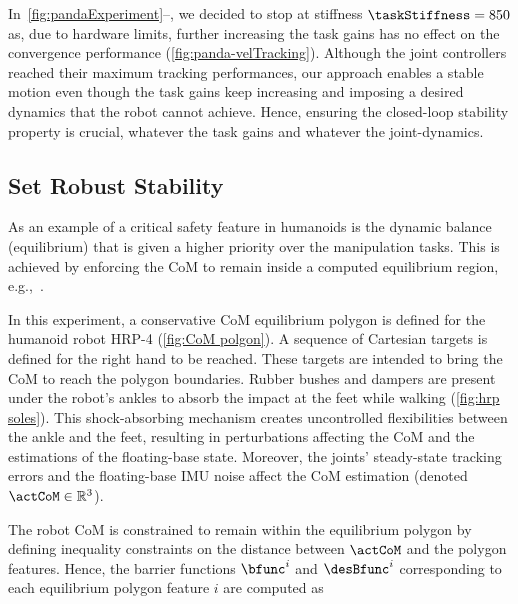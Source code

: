 In~\cref{fig:pandaExperiment}--, we decided to stop at stiffness $\taskStiffness=850$ as, due to hardware limits, further increasing the task gains has no effect on the convergence performance (\cref{fig:panda-velTracking}). Although the joint controllers reached their maximum tracking performances, our approach enables a stable motion even though the task gains keep increasing and imposing a desired dynamics that the robot cannot achieve. Hence, ensuring the closed-loop stability property is crucial, whatever the task gains and whatever the joint-dynamics.%

\subsection{Set Robust Stability}\label{subsec-chap3:expreiment_robust safety}%

As an example of a critical safety feature in humanoids is the dynamic balance (equilibrium) that is given a higher priority over the manipulation tasks. This is achieved by enforcing the CoM to remain inside a computed equilibrium region, e.g.,~\cite{audren2018tro,samadi2021ral}. 

In this experiment, a conservative CoM equilibrium polygon is defined for the humanoid robot HRP-4 (\cref{fig:CoM polgon}). A sequence of Cartesian targets is defined for the right hand to be reached. These targets are intended to bring the CoM to reach the polygon boundaries. Rubber bushes and dampers are present under the robot's ankles to absorb the impact at the feet while walking (\cref{fig:hrp soles}). This shock-absorbing mechanism creates uncontrolled flexibilities between the ankle and the feet, resulting in perturbations affecting the CoM and the estimations of the floating-base state. Moreover, the joints' steady-state tracking errors and the floating-base IMU noise affect the CoM estimation (denoted $\actCoM\in\mathbb{R}^3$). 

The robot CoM is constrained to remain within the equilibrium polygon by defining inequality constraints on the distance between $\actCoM$ and the polygon features.
Hence, the barrier functions $\bfunc^i$ and $\desBfunc^i$ corresponding to each equilibrium polygon feature $i$ are computed as 

